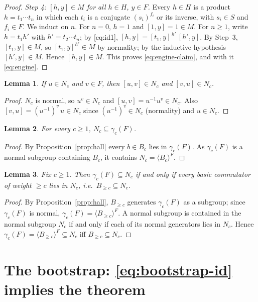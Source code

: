 \documentclass{amsart}
\newtheorem{lemma}{Lemma}
\theoremstyle{definition}
\theoremstyle{remark}
\begin{document}
\begin{proof}
\smallskip
\emph{Step 4: $[h,y]\in M$ for all $h\in H$, $y\in F$.}
Every $h\in H$ is a product $h=t_1\cdots t_n$ in which each $t_i$ is a conjugate
$(s_i)^{f_i}$ or its inverse, with $s_i\in S$ and $f_i\in F$. We induct on $n$.
For $n=0$, $h=1$ and $[1,y]=1\in M$. For $n\ge1$, write $h=t_1 h'$ with
$h'=t_2\cdots t_n$; by \eqref{eq:id1},
$[h,y]=[t_1,y]^{\,h'}\,[h',y]$. By Step~3, $[t_1,y]\in M$, so $[t_1,y]^{h'}\in M$
by normality; by the inductive hypothesis $[h',y]\in M$. Hence $[h,y]\in M$. This
proves \eqref{eq:engine-claim}, and with it \eqref{eq:engine}.
\end{proof}

\begin{lemma}\label{lem:caseA}
If $u\in N_c$ and $v\in F$, then $[u,v]\in N_c$ and $[v,u]\in N_c$.
\end{lemma}

\begin{proof}
$N_c$ is normal, so $u^{v}\in N_c$ and $[u,v]=u^{-1}u^{v}\in N_c$. Also
$[v,u]=(u^{-1})^{v}\,u\in N_c$ since $(u^{-1})^{v}\in N_c$ (normality) and
$u\in N_c$.
\end{proof}

\begin{lemma}\label{lem:easy}
For every $c\ge1$, $N_c\subseteq\gamma_c(F)$.
\end{lemma}

\begin{proof}
By Proposition~\ref{prop:hall} every $b\in B_c$ lies in $\gamma_c(F)$. As
$\gamma_c(F)$ is a normal subgroup containing $B_c$, it contains
$N_c=\langle B_c\rangle^{F}$.
\end{proof}

\begin{lemma}\label{lem:reduce-to-Bw}
Fix $c\ge1$. Then $\gamma_c(F)\subseteq N_c$ if and only if every basic commutator
of weight $\ge c$ lies in $N_c$, i.e.\ $B_{\ge c}\subseteq N_c$.
\end{lemma}

\begin{proof}
By Proposition~\ref{prop:hall}, $B_{\ge c}$ generates $\gamma_c(F)$ as a subgroup;
since $\gamma_c(F)$ is normal, $\gamma_c(F)=\langle B_{\ge c}\rangle^{F}$. A normal
subgroup is contained in the normal subgroup $N_c$ if and only if each of its
normal generators lies in $N_c$. Hence
$\gamma_c(F)=\langle B_{\ge c}\rangle^{F}\subseteq N_c$ iff $B_{\ge c}\subseteq
N_c$.
\end{proof}

\section{The bootstrap: \eqref{eq:bootstrap-id} implies the theorem}
\label{sec:bootstrap}
\end{document}
